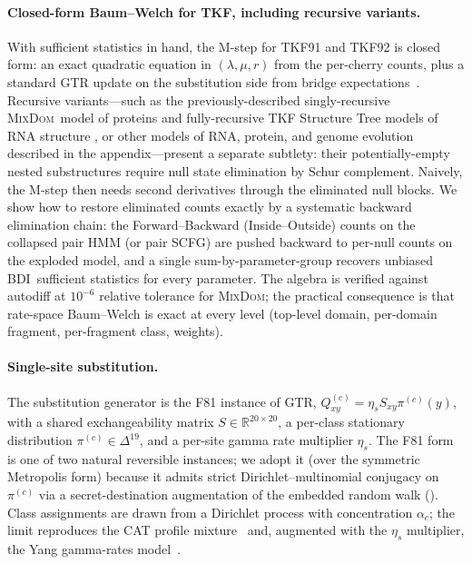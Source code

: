 \documentclass[11pt]{article}
\theoremstyle{definition}
\theoremstyle{remark}
\newcommand{\MixDom}{\textsc{MixDom}}
\newcommand{\BDI}{\textsc{BDI}}
\begin{document}
\paragraph{Closed-form Baum--Welch for TKF, including recursive variants.}
With sufficient statistics in hand, the M-step for TKF91 and TKF92
is closed form: an exact quadratic equation in
$(\lambda, \mu, r)$ from the per-cherry counts, plus a standard
GTR update on the substitution side from bridge expectations~\citep{HolmesRubin2002}.
Recursive variants---such as the previously-described singly-recursive \MixDom\ model of proteins \cite{LargeHolmes2026} and
fully-recursive TKF Structure Tree models of RNA structure \cite{Holmes2004}, or other models of RNA, protein, and genome evolution described in the appendix---present a separate subtlety: 
their potentially-empty nested substructures require null state elimination by Schur complement.
Naively, the M-step then needs second derivatives through the eliminated null blocks. We
show how to restore eliminated counts exactly by a systematic backward
elimination chain:
the Forward--Backward (Inside--Outside) counts on the collapsed pair HMM (or pair SCFG) are pushed
backward to per-null counts on the
exploded model, and a single sum-by-parameter-group recovers
unbiased \BDI\ sufficient statistics for every parameter.
The
algebra is verified against autodiff at $10^{-6}$ relative tolerance for \MixDom; the
practical consequence is that rate-space Baum--Welch is exact at every
level (top-level domain, per-domain fragment, per-fragment class,
weights).

\paragraph{Single-site substitution.}
The substitution generator is the F81 instance of GTR,
$Q^{(c)}_{xy} = \eta_s S_{xy} \pi^{(c)}(y)$, with a shared
exchangeability matrix $S \in \mathbb{R}^{20 \times 20}$, a
per-class stationary distribution $\pi^{(c)} \in \Delta^{19}$, and
a per-site gamma rate multiplier $\eta_s$. The F81 form is one of
two natural reversible instances; we adopt it (over the symmetric
Metropolis form) because it admits strict Dirichlet--multinomial
conjugacy on $\pi^{(c)}$ via a secret-destination augmentation of the embedded random walk
(). Class assignments are drawn from a Dirichlet
process with concentration $\alpha_c$; the limit reproduces the CAT
profile mixture~\citep{lartillotcat} and, augmented with the
$\eta_s$ multiplier, the Yang gamma-rates model~\citep{Yang1994a}.
\end{document}
